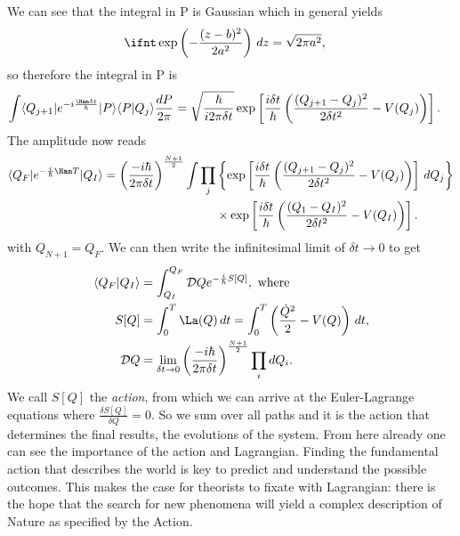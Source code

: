 \documentclass[a4paper, 11pt, normalem]{report}
\begin{document}
We can see that the integral in P is Gaussian which in general yields
\begin{align}
    \ifnt \exp\left(-\frac{(z-b)^2}{2a^2}\right)\,dz &= \sqrt{2\pi a^2},
\end{align}
so therefore the integral in P is
\begin{align}
    \int \langle Q_{j+1}|e^{-i\frac{\Ham\delta t}{\hbar}}|P\rangle\langle P|Q_j\rangle\frac{dP}{2\pi} &= \sqrt{\frac{\hbar}{i2\pi\delta t}}\exp\left[\frac{i\delta t}{\hbar}\left(\frac{(Q_{j+1}-Q_j)^2}{2\delta t^2} - V(Q_j)\right)\right].
\end{align}
The amplitude now reads
\begin{align}
    \begin{split}
        \langle Q_F|e^{-\frac{i}{\hbar}\Ham T}|Q_I\rangle = \left(\frac{-i\hbar}{2\pi\delta t}\right)^{\frac{N+1}{2}} \int \prod_j &\left\{\exp\left[\frac{i\delta t}{\hbar}\left(\frac{(Q_{j+1}-Q_j)^2}{2\delta t^2}-V(Q_j)\right)\right]\,dQ_j\right\} \\
                                                                                                                                   &\times \exp\left[\frac{i\delta t}{\hbar}\left(\frac{(Q_1-Q_I)^2}{2\delta t^2}-V(Q_I)\right)\right].
    \end{split}
\end{align}
with $Q_{N+1}=Q_F$.
We can then write the infinitesimal limit of $\delta t\to0$ to get
\begin{align}
    \langle Q_F|Q_I\rangle &= \int_{Q_I}^{Q_F} \mathcal{D}Qe^{-\frac{i}{\hbar}S[Q]}, \text{ where }\\
    S[Q] &= \int_0^T \La(Q)\,dt = \int_0^T \left(\frac{\dot{Q}^2}{2}-V(Q)\right)\,dt, \\
    \mathcal{D}Q &= \lim_{\delta t\to0} \left(\frac{-i\hbar}{2\pi\delta t}\right)^{\frac{N+1}{2}}\prod_i dQ_i.
\end{align}
We call $S[Q]$ the \emph{action}, from which we can arrive at the Euler-Lagrange equations where $\frac{\delta S[Q]}{\delta Q} = 0$.
So we sum over all paths and it is the action that determines the final results, the evolutions of the system.
From here already one can see the importance of the action and Lagrangian. Finding the fundamental action that describes the world is key to predict and understand the possible outcomes.
This makes the case for theorists to fixate with Lagrangian: there is the hope that the search for new phenomena will yield a complex description of Nature as specified by the Action.
\end{document}
